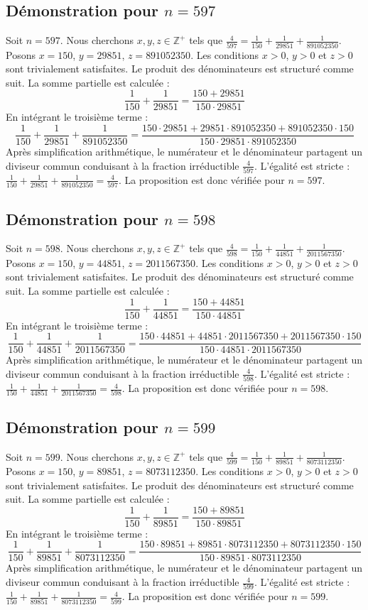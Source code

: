 \documentclass[11pt,a4paper]{article}
\begin{document}
\subsection{Démonstration pour $n = 597$}
Soit $n = 597$. Nous cherchons $x, y, z \in \mathbb{Z}^{+}$ tels que $\frac{4}{597} = \frac{1}{150} + \frac{1}{29851} + \frac{1}{891052350}$.
Posons $x = 150$, $y = 29851$, $z = 891052350$.
Les conditions $x > 0$, $y > 0$ et $z > 0$ sont trivialement satisfaites.
Le produit des dénominateurs est structuré comme suit. La somme partielle est calculée :
$$ \frac{1}{150} + \frac{1}{29851} = \frac{150+29851}{150 \cdot 29851} $$
En intégrant le troisième terme :
$$ \frac{1}{150} + \frac{1}{29851} + \frac{1}{891052350} = \frac{150 \cdot 29851 + 29851 \cdot 891052350 + 891052350 \cdot 150}{150 \cdot 29851 \cdot 891052350} $$
Après simplification arithmétique, le numérateur et le dénominateur partagent un diviseur commun conduisant à la fraction irréductible $\frac{4}{597}$.
L'égalité est stricte : $\frac{1}{150} + \frac{1}{29851} + \frac{1}{891052350} = \frac{4}{597}$.
La proposition est donc vérifiée pour $n = 597$.
\subsection{Démonstration pour $n = 598$}
Soit $n = 598$. Nous cherchons $x, y, z \in \mathbb{Z}^{+}$ tels que $\frac{4}{598} = \frac{1}{150} + \frac{1}{44851} + \frac{1}{2011567350}$.
Posons $x = 150$, $y = 44851$, $z = 2011567350$.
Les conditions $x > 0$, $y > 0$ et $z > 0$ sont trivialement satisfaites.
Le produit des dénominateurs est structuré comme suit. La somme partielle est calculée :
$$ \frac{1}{150} + \frac{1}{44851} = \frac{150+44851}{150 \cdot 44851} $$
En intégrant le troisième terme :
$$ \frac{1}{150} + \frac{1}{44851} + \frac{1}{2011567350} = \frac{150 \cdot 44851 + 44851 \cdot 2011567350 + 2011567350 \cdot 150}{150 \cdot 44851 \cdot 2011567350} $$
Après simplification arithmétique, le numérateur et le dénominateur partagent un diviseur commun conduisant à la fraction irréductible $\frac{4}{598}$.
L'égalité est stricte : $\frac{1}{150} + \frac{1}{44851} + \frac{1}{2011567350} = \frac{4}{598}$.
La proposition est donc vérifiée pour $n = 598$.
\subsection{Démonstration pour $n = 599$}
Soit $n = 599$. Nous cherchons $x, y, z \in \mathbb{Z}^{+}$ tels que $\frac{4}{599} = \frac{1}{150} + \frac{1}{89851} + \frac{1}{8073112350}$.
Posons $x = 150$, $y = 89851$, $z = 8073112350$.
Les conditions $x > 0$, $y > 0$ et $z > 0$ sont trivialement satisfaites.
Le produit des dénominateurs est structuré comme suit. La somme partielle est calculée :
$$ \frac{1}{150} + \frac{1}{89851} = \frac{150+89851}{150 \cdot 89851} $$
En intégrant le troisième terme :
$$ \frac{1}{150} + \frac{1}{89851} + \frac{1}{8073112350} = \frac{150 \cdot 89851 + 89851 \cdot 8073112350 + 8073112350 \cdot 150}{150 \cdot 89851 \cdot 8073112350} $$
Après simplification arithmétique, le numérateur et le dénominateur partagent un diviseur commun conduisant à la fraction irréductible $\frac{4}{599}$.
L'égalité est stricte : $\frac{1}{150} + \frac{1}{89851} + \frac{1}{8073112350} = \frac{4}{599}$.
La proposition est donc vérifiée pour $n = 599$.
\end{document}
